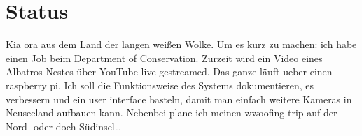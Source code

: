 \chapter{Status}

Kia ora aus dem Land der langen weißen Wolke. Um es kurz zu machen: ich
habe einen Job beim Department of Conservation. Zurzeit wird ein Video
eines Albatros-Nestes \"uber YouTube live gestreamed. Das ganze l\"auft
ueber einen raspberry pi. Ich soll die Funktionsweise des Systems
dokumentieren, es verbessern und ein user interface basteln, damit man
einfach weitere Kameras in Neuseeland aufbauen kann. Nebenbei plane ich
meinen wwoofing trip auf der Nord- oder doch S\"udinsel\ldots{}
